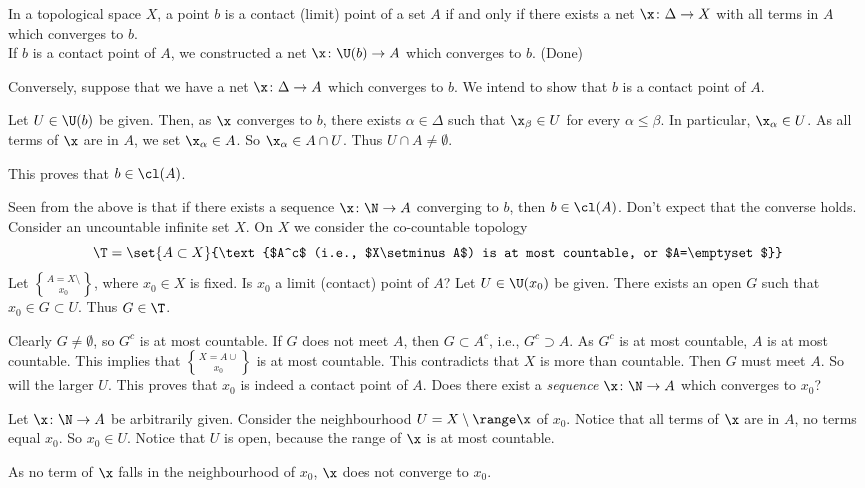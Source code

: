 \prop In a topological space $X$, a point $b$ is a contact (limit) point of a set $A$ if and only if there exists a net $\x\colon\Delta\to X$ with all terms in $A$ which converges to $b$. \\
\pf If $b$ is a contact point of $A$, we constructed a net $\x\colon\U(b)\to A$ which converges to $b$.  (Done)

Conversely, suppose that we have a net $\x\colon\Delta\to A$ which converges to $b$.  We intend to show that $b$ is a contact point of $A$.

Let $U\in\U(b)$ be given.  Then, as $\x$ converges to $b$, there exists $\alpha\in\Delta$ such that $\x_\beta\in U$ for every $\alpha\leq\beta$.  In particular, $\x_\alpha\in U$.  As all terms of $\x$ are in $A$, we set $\x_\alpha\in A$.  So $\x_\alpha\in A\cap U$.  Thus $U\cap A\neq\emptyset$.

This proves that $b\in\cl(A)$.

\eg Seen from the above is that if there exists a sequence $\x\colon\N\to A$ converging to $b$, then $b\in\cl(A)$.  Don't expect that the converse holds.  Consider an uncountable infinite set $X$.  On $X$ we consider the co-countable topology
\[ \T = \set{A\subset X}{\text{$A^c$ (i.e., $X\setminus A$) is at most countable, or $A=\emptyset$}} \]
Let $A=X\setminus\brace{x_0}$, where $x_0\in X$ is fixed.  Is $x_0$ a limit (contact) point of $A$?  Let $U\in\U(x_0)$ be given.  There exists an open $G$ such that $x_0\in G\subset U$. %
Thus $G\in\T$.

Clearly $G\neq\emptyset$, so $G^c$ is at most countable.
If $G$ does not meet $A$, then $G\subset A^c$, i.e., $G^c\supset A$.  As $G^c$ is at most countable, $A$ is at most countable.  This implies that $X=A\cup\brace{x_0}$ is at most countable.  This contradicts that $X$ is more than countable.  Then $G$ must meet $A$.  So will the larger $U$.  This proves that $x_0$ is indeed a contact point of $A$.  Does there exist a \emph{sequence} $\x\colon\N\to A$ which converges to $x_0$?

Let $\x\colon\N\to A$ be arbitrarily given.
Consider the neighbourhood $U=X\setminus\range\x$ of $x_0$.  Notice that all %
terms of $\x$ are %
in $A$, no terms equal $x_0$.  So $x_0\in U$.  Notice that $U$ is open, because the range of $\x$ is at most countable.

As no term of $\x$ falls in the neighbourhood of $x_0$, $\x$ does not converge to $x_0$.
